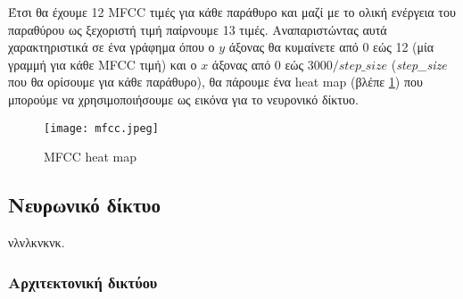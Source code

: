 Έτσι θα έχουμε 12 MFCC τιμές για κάθε παράθυρο και μαζί με το ολική ενέργεια
του παραθύρου ως ξεχοριστή τιμή παίρνουμε 13 τιμές. Αναπαριστώντας αυτά
χαρακτηριστικά σε ένα γράφημα όπου ο $y$ άξονας θα κυμαίνετε από 0 εώς 12 (μία
γραμμή για κάθε MFCC τιμή) και ο $x$ άξονας από 0 εώς $3000 / step\_size$
(\emph{step\_size} που θα ορίσουμε για κάθε παράθυρο), θα πάρουμε ένα heat map
(βλέπε \ref{mfcc}) που μπορούμε να χρησιμοποιήσουμε ως εικόνα για το νευρονικό
δίκτυο.

\begin{figure}[H]
	\center
	\texttt{[image: mfcc.jpeg]}
	\caption{MFCC heat map \cite{fayek2016}}
	\label{mfcc}
\end{figure}

\subsection{Νευρωνικό δίκτυο}

νλνλκνκνκ.
\subsubsection{Αρχιτεκτονική δικτύου}
